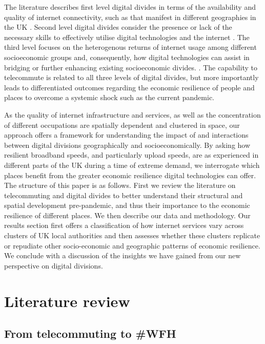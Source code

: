 \documentclass[]{interact}
\theoremstyle{plain}%
\theoremstyle{definition}
\theoremstyle{remark}
\begin{document}
The literature describes first level digital divides in terms of the
availability and quality of internet connectivity, such as that manifest
in different geographies in the UK
\citep{riddlesden2014broadband, philip2017digital}. Second level digital
divides consider the presence or lack of the necessary skills to
effectively utilise digital technologies and the internet
\citep{blank2014dimensions, van2011internet}. The third level focuses on
the heterogenous returns of internet usage among different socioeconomic
groups and, consequently, how digital technologies can assist in
bridging or further enhancing existing socioeconomic divides.
\citep{stern2009levels, van2014digital, van2015third}. The capability to
telecommute is related to all three levels of digital divides, but more
importantly leads to differentiated outcomes regarding the economic
resilience of people and places to overcome a systemic shock such as the
current pandemic.

As the quality of internet infrastructure and services, as well as the
concentration of different occupations are spatially dependent and
clustered in space, our approach offers a framework for understanding
the impact of and interactions between digital divisions geographically
and socioeconomically. By asking how resilient broadband speeds, and
particularly upload speeds, are as experienced in different parts of the
UK during a time of extreme demand, we interrogate which places benefit
from the greater economic resilience digital technologies can offer. The
structure of this paper is as follows. First we review the literature on
telecommuting and digital divides to better understand their structural
and spatial development pre-pandemic, and thus their importance to the
economic resilience of different places. We then describe our data and
methodology. Our results section first offers a classification of how
internet services vary across clusters of UK local authorities and then
assesses whether these clusters replicate or repudiate other
socio-economic and geographic patterns of economic resilience. We
conclude with a discussion of the insights we have gained from our new
perspective on digital divisions.

\hypertarget{sec:2}{%
\section{Literature review}\label{sec:2}}

\hypertarget{sec:2.1}{%
\subsection{From telecommuting to \#WFH}\label{sec:2.1}}
\end{document}
